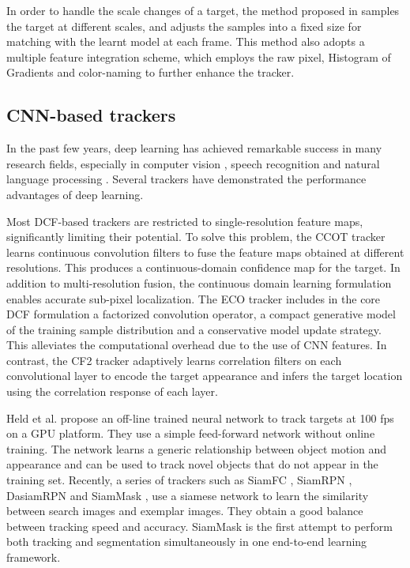 \documentclass[review]{elsarticle}
\begin{document}
\begin{CJK*}{UTF8}{gbsn}
In order to handle the scale changes of a target, the method proposed in \cite{Li2014ASA} samples the target at different scales, and adjusts the samples into a fixed size for matching with the learnt model at each frame. This method also adopts a multiple feature integration scheme, which employs the raw pixel, Histogram of Gradients \cite{Forsyth2014ObjectDW} and color-naming \cite{Weijer2009LearningCN} to further enhance the tracker.

\subsection{CNN-based trackers}
In the past few years, deep learning \cite{Goodfellow2015DeepL} has achieved remarkable success in many research fields, especially in computer vision \cite{Girshick2016RegionBasedCN, Schroff2015FaceNetAU}, speech recognition \cite{Kim2016JointCB, Wu2015DeepNN} and natural language processing \cite{Vinyals2014GrammarAA, Bahdanau2014NeuralMT}. Several trackers have demonstrated the performance advantages of deep learning. 

Most DCF-based trackers are restricted to single-resolution feature maps, significantly limiting their potential. To solve this problem, the CCOT tracker \cite{Danelljan2016BeyondCF} learns continuous convolution filters to fuse the feature maps obtained at different resolutions. This produces a continuous-domain confidence map for the target. In addition to multi-resolution fusion, the continuous domain learning formulation enables accurate sub-pixel localization.
The ECO tracker \cite{Danelljan2016ECOEC} includes in the core DCF formulation a factorized convolution operator, a compact generative model of the training sample distribution and a conservative model update strategy. This alleviates the computational overhead due to the use of CNN features. In contrast, the CF2 tracker \cite{Ma2015HierarchicalCF} adaptively learns correlation filters on each convolutional layer to encode the target appearance and infers the target location using the correlation response of each layer.

Held et al. \cite{held2016learning} propose an off-line trained neural network to track targets at 100 fps on a GPU platform. They use a simple feed-forward network without online training. The network learns a generic relationship between object motion and appearance and can be used to track novel objects that do not appear in the training set. 
Recently, a series of trackers such as SiamFC \cite{bertinetto2016fully}, SiamRPN \cite{Li2018HighPV}, DasiamRPN \cite{zhu2018distractor} and SiamMask \cite{Wang2018SiamMask}, use a siamese network to learn the similarity between search images and exemplar images. They obtain a good balance between tracking speed and accuracy. SiamMask is the first attempt to perform both tracking and segmentation simultaneously in one end-to-end learning framework.


\end{CJK*}
\end{document}

